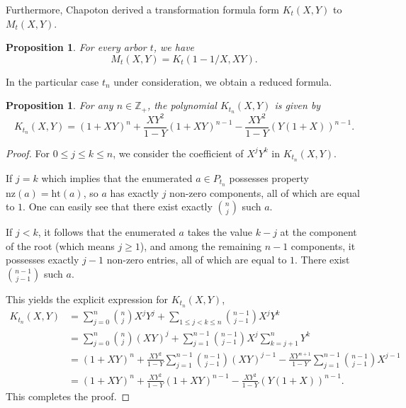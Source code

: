 \documentclass[reqno, 12pt]{article}
\newtheorem{prop}[thm]{Proposition}
\theoremstyle{mydefinition}
\theoremstyle{myremark}
\begin{document}
Furthermore, Chapoton derived a transformation formula form $K_t(X,Y)$ to $M_t(X,Y)$.
\begin{prop}{\em \cite[Proposition 2.10]{Chapoton}}\label{Chap2.10}
For every arbor $t$, we have
$$M_t(X,Y)=K_t(1-1/X, XY).$$
\end{prop}

In the particular case $t_{n}$ under consideration, we obtain a reduced formula.

\begin{prop}\label{FormulaK_t_n}
For any $n\in \mathbb{Z}_{+}$, the polynomial $K_{t_n}(X,Y)$ is given by
$$K_{t_n}(X,Y) = (1+XY)^n + \frac{XY^2}{1-Y} (1+XY)^{n-1} - \frac{XY^2}{1-Y} (Y(1+X))^{n-1}.$$
\end{prop}
\begin{proof}
For $0\le j\le k\le n$, we consider the coefficient of $X^{j}Y^{k}$ in $K_{t_{n}}(X,Y)$.

If $j=k$ which implies that the enumerated $a\in P_{t_{n}}$ possesses property $\mathrm{nz}(a)=\mathrm{ht}(a)$, so $a$ has exactly $j$ non-zero components, all of which are equal to $1$. One can easily see that there exist exactly $\binom{n}{j}$ such $a$. 

If $j<k$, it follows that the enumerated $a$ takes the value $k-j$ at the component of the root (which means $j\geq 1$), and among the remaining $n-1$ components, it possesses exactly $j-1$ non-zero entries, all of which are equal to $1$. There exist $\binom{n-1}{j-1}$ such $a$.

This yields the explicit expression for $K_{t_{n}}(X,Y)$,
\begin{align*}
 K_{t_n}(X,Y) &=\sum_{j=0}^{n}\binom{n}{j}X^{j}Y^{j}+\sum_{1\le j<k\le n}\binom{n-1}{j-1}X^{j}Y^{k}\\
 &= \sum_{j=0}^n \binom{n}{j} (XY)^j + \sum_{j=1}^{n-1} \binom{n-1}{j-1} X^j \sum_{k=j+1}^n Y^k \\
 &=(1+XY)^{n}+ \frac{XY^2}{1-Y}\sum_{j=1}^{n-1} \binom{n-1}{j-1} (XY)^{j-1} -\frac{XY^{n+1}}{1-Y}\sum_{j=1}^{n-1} \binom{n-1}{j-1} X^{j-1}\\
 &= (1+XY)^n + \frac{XY^2}{1-Y} (1+XY)^{n-1} - \frac{XY^2}{1-Y} (Y(1+X))^{n-1}.
\end{align*}
This completes the proof.
\end{proof}
\end{document}

